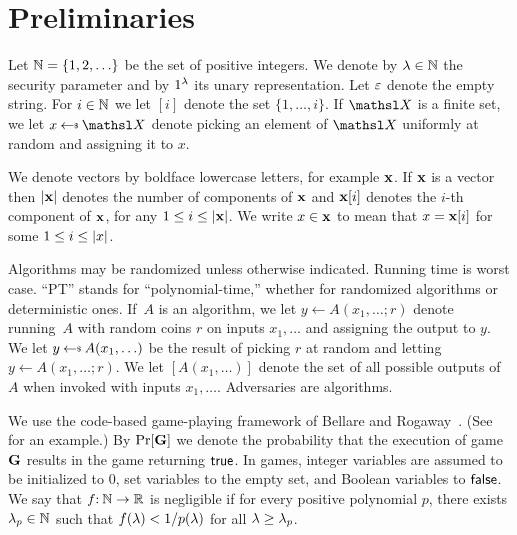 \section{Preliminaries}\label{sec-defs}

Let ${{\mathbb N}} =\{1,2,\ldots\}$ be the set of positive integers.
We denote by $\lambda\in{{\mathbb N}}$ the security parameter and by $1^\lambda$ its unary representation. 
Let $\varepsilon$ denote the empty string.
For $i\in{{\mathbb N}}$ we let $[i]$ denote the set $\{1, \ldots, i\}$. 
If $\setX$ is a finite set, we let $x \getsr \setX$ denote picking an element of $\setX$ uniformly at random and assigning it to $x$.

We denote vectors by boldface lowercase letters, for example ${\bf x}$.
If ${\bf x}$ is a vector then $|{\bf x}|$ denotes the number of components of ${\bf x}$ and ${\bf x}[i]$ denotes the $i$-th component of ${\bf x}$, for any $1 \leq i \leq |{\bf x}|$.
We write $x\in{\bf x}$ to mean that $x={\bf x}[i]$ for some $1\leq i \leq |x|$.

Algorithms may be randomized unless otherwise indicated.
Running time is worst case.
``PT'' stands for ``polynomial-time,'' whether for randomized algorithms or deterministic ones. 
If~$A$ is an algorithm, we let $y \gets A(x_1,\ldots;r)$ denote running~$A$ with random coins $r$ on inputs $x_1,\ldots$ and assigning the output to $y$.
We let $y \getsr A(x_1,\ldots)$ be the result of picking $r$ at random and letting $y \gets A(x_1,\ldots;r)$.
We let $[A(x_1,\ldots)]$ denote the set of all possible outputs of $A$ when invoked with inputs $x_1,\ldots$.
Adversaries are algorithms.

We use the code-based game-playing framework of Bellare and Rogaway~\cite{EC:BelRog06}.
(See  for an example.)
By $\Pr[\mathbf{G}]$ we denote the probability that the execution of game $\mathbf{G}$ results in the game returning $\mathsf{true}$.
In games, integer variables are assumed to be initialized to $0$, set variables to the empty set, and Boolean variables to $\mathsf{false}$. %
We say that $f{:\:}{{\mathbb N}}\to{{\mathbb R}}$ is negligible if for every positive polynomial $p$, there exists $\lambda_p\in{{\mathbb N}}$ such that $f(\lambda) < 1/p(\lambda)$ for all $\lambda \geq \lambda_p$.